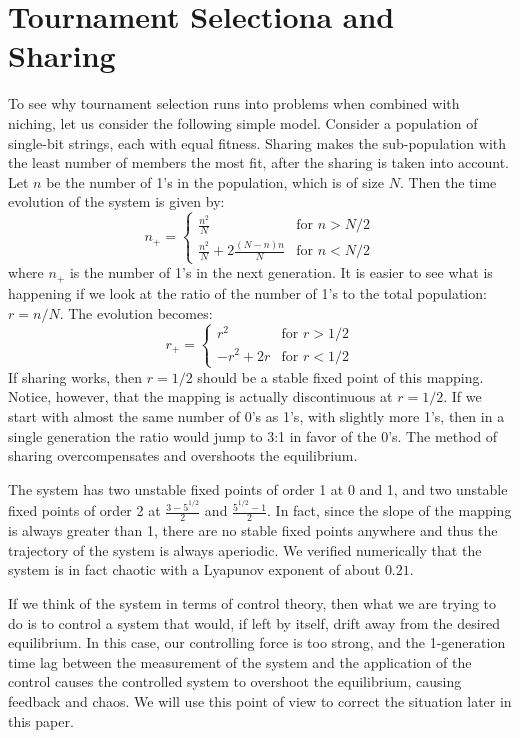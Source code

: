 \section{Tournament Selectiona and Sharing}
To see why tournament selection runs into problems when combined with niching,
let us consider the following simple model.  Consider a population of
single-bit strings, each with equal fitness.  Sharing makes the sub-population
with the least number of members the most fit, after the sharing is taken into
account.  Let $n$ be the number of 1's in the population, which is of size $N$.
Then the time evolution of the system is given by:
\begin{equation}
n_+=\left\{ \begin{array}{ll}
	\frac{n^2}{N} & \mbox{for $n>N/2$} \\
	\frac{n^2}{N} + 2 \frac{(N-n)n}{N} & \mbox{for $n<N/2$}
	\end{array}
\right. 
\end{equation}
where $n_+$ is the number of 1's in the next generation.  It is easier to
see what is happening if we look at the ratio of the number of 1's to the
total population: $r=n/N$.  The evolution becomes:
\begin{equation}
r_+=\left\{ \begin{array}{ll}
	r^2 & \mbox{for $r>1/2$}\\
	-r^2+2r & \mbox{for $r<1/2$}
	\end{array}
\right.
\end{equation}
If sharing works, then $r=1/2$ should be a stable fixed point of this mapping.
Notice, however, that the mapping is actually discontinuous at $r=1/2$.
If we start with almost the same number of 0's as 1's, with slightly more 1's,
then in a single generation the ratio would jump to 3:1 in favor of the 0's.
The method of sharing overcompensates and overshoots the equilibrium.

The system has two unstable fixed points of order 1 at 0 and 1, and two unstable
fixed points of order 2 at $\frac{3-5^{1/2}}{2}$ and $\frac{5^{1/2}-1}{2}$.
In fact, since the slope of the mapping is always greater than 1, there are
no stable fixed points anywhere and thus the trajectory of the system is
always aperiodic.  We verified numerically that the system is in fact chaotic
with a Lyapunov exponent of about $0.21$.

If we think of the system in terms of control theory, then what we are trying
to do is to control a system that would, if left by itself, drift away
from the desired equilibrium.  In this case, our controlling force is too
strong, and the 1-generation time lag between the measurement of the system
and the application of the control causes the controlled system to overshoot
the equilibrium, causing feedback and chaos.  We will use this point of view
to correct the situation later in this paper.

